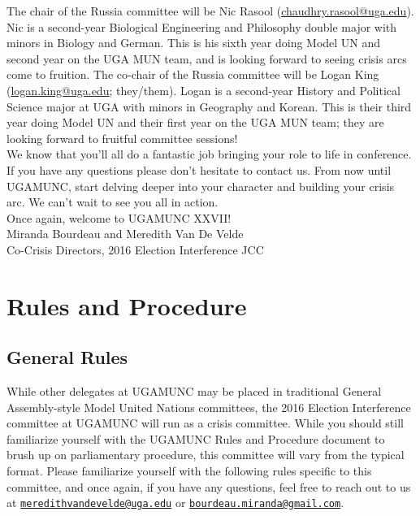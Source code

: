\documentclass[10pt, letterpaper]{article}
\begin{document}
The chair of the Russia committee will be Nic Rasool
(\href{mailto:chaudhry.rasool@uga.edu}{\underline{chaudhry.rasool@uga.edu}}).
Nic is a second-year Biological Engineering and Philosophy double major
with minors in Biology and German. This is his sixth year doing Model UN
and second year on the UGA MUN team, and is looking forward to seeing
crisis arcs come to fruition. The co-chair of the Russia committee will
be Logan King
(\href{mailto:logan.king@uga.edu}{\underline{logan.king@uga.edu}};
they/them). Logan is a second-year History and Political Science major
at UGA with minors in Geography and Korean. This is their third year
doing Model UN and their first year on the UGA MUN team; they are
looking forward to fruitful committee sessions! \\

We know that you'll all do a fantastic job bringing your role to life in
conference. If you have any questions please don't hesitate to contact
us. From now until UGAMUNC, start delving deeper into your character and
building your crisis arc. We can't wait to see you all in action. \\

Once again, welcome to UGAMUNC XXVII! \\

Miranda Bourdeau and Meredith Van De Velde\\
Co-Crisis Directors, 2016 Election Interference JCC

\newpage
\tableofcontents
\newpage

\section{Rules and Procedure}

\subsection{General Rules}

While other delegates at UGAMUNC may be placed in traditional General
Assembly-style Model United Nations committees, the 2016 Election
Interference committee at UGAMUNC will run as a crisis committee. While
you should still familiarize yourself with the UGAMUNC Rules and
Procedure document to brush up on parliamentary procedure, this
committee will vary from the typical format. Please familiarize yourself
with the following rules specific to this committee, and once again, if
you have any questions, feel free to reach out to us at
\texttt{\href{mailto:meredithvandevelde@uga.edu}{meredithvandevelde@uga.edu}}
or
\texttt{\href{mailto:bourdeau.miranda@gmail.com}{bourdeau.miranda@gmail.com}}. \\
\end{document}
